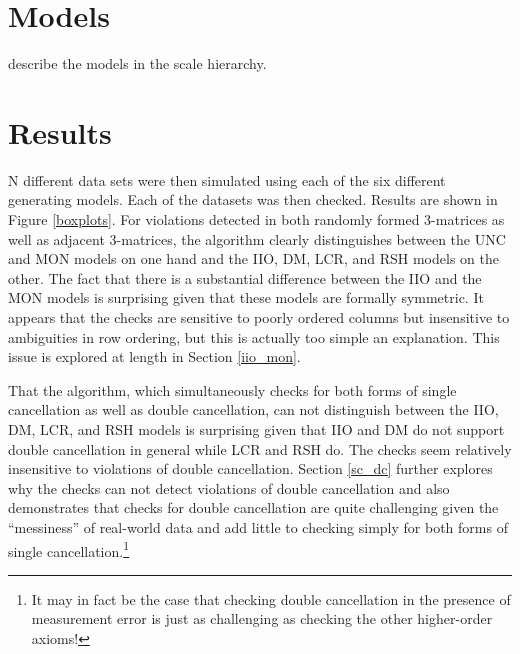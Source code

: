 \documentclass[12pt]{article}
\begin{document}
\section{Models}
describe the models in the scale hierarchy. 

 
\section{Results}

N different data sets were then simulated using each of the six different generating models. Each of the datasets was then checked. Results are shown in Figure \ref{boxplots}. For violations detected in both randomly formed 3-matrices as well as adjacent 3-matrices, the algorithm clearly distinguishes between the UNC and MON models on one hand and the IIO, DM, LCR, and RSH models on the other. The fact that there is a substantial difference between the IIO and the MON models is surprising given that these models are formally symmetric. It appears that the checks are sensitive to poorly ordered columns but insensitive to ambiguities in row ordering, but this is actually too simple an explanation. This issue is explored at length in Section \ref{iio_mon}.

That the algorithm, which simultaneously checks for both forms of single cancellation as well as double cancellation, can not distinguish between the IIO, DM, LCR, and RSH models is surprising given that IIO and DM do not support double cancellation in general while LCR and RSH do. The checks seem relatively insensitive to violations of double cancellation. Section \ref{sc_dc} further explores why the checks can not detect violations of double cancellation and also demonstrates that checks for double cancellation are quite challenging given the ``messiness'' of real-world data and add little to checking simply for both forms of single cancellation.\footnote{It may in fact be the case that checking double cancellation in the presence of measurement error is just as challenging as checking the other higher-order axioms!} 
\end{document}
